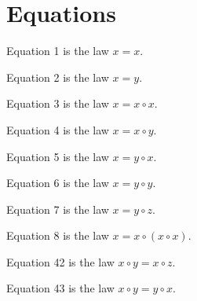 \chapter{Equations}

\begin{definition}[Equation 1]\label{eq1}\leanok{}  Equation 1 is the law $x=x$.
\end{definition}

\begin{definition}[Equation 2]\label{eq2}\leanok{}  Equation 2 is the law $x=y$.
\end{definition}

\begin{definition}[Equation 3]\label{eq3}\leanok{}  Equation 3 is the law $x=x \circ x$.
\end{definition}

\begin{definition}[Equation 4]\label{eq4}\leanok{}  Equation 4 is the law $x=x \circ y$.
\end{definition}

\begin{definition}[Equation 5]\label{eq5}\leanok{}  Equation 5 is the law $x=y \circ x$.
\end{definition}

\begin{definition}[Equation 6]\label{eq6}\leanok{}  Equation 6 is the law $x=y \circ y$.
\end{definition}

\begin{definition}[Equation 7]\label{eq7}\leanok{}  Equation 7 is the law $x=y \circ z$.
\end{definition}

\begin{definition}[Equation 8]\label{eq8}\leanok{}  Equation 8 is the law $x=x \circ (x \circ x)$.
\end{definition}

\begin{definition}[Equation 42]\label{eq42}\leanok{}  Equation 42 is the law $x \circ y = x \circ z$.
\end{definition}

\begin{definition}[Equation 43]\label{eq43}\leanok{}  Equation 43 is the law $x \circ y = y \circ x$.
\end{definition}

